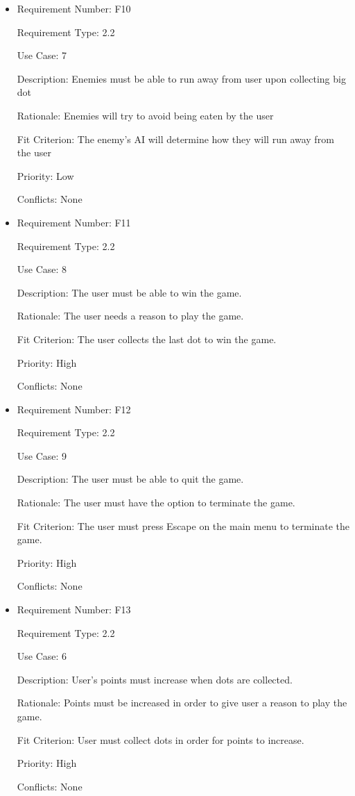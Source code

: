 \documentclass[12pt, titlepage]{article}
\begin{document}
\begin{itemize}
\item
Requirement Number: F10

Requirement Type: 2.2

Use Case: 7

Description: Enemies must be able to run away from user upon collecting big dot

Rationale: Enemies will try to avoid being eaten by the user

Fit Criterion: The enemy's AI will determine how they will run away from the user

Priority: Low

Conflicts: None
\end{itemize}

\begin{itemize}
\item
Requirement Number: F11

Requirement Type: 2.2

Use Case: 8

Description: The user must be able to win the game.

Rationale: The user needs a reason to play the game.

Fit Criterion: The user collects the last dot to win the game.

Priority: High

Conflicts: None
\end{itemize}

\begin{itemize}
\item
Requirement Number: F12

Requirement Type: 2.2

Use Case: 9

Description: The user must be able to quit the game.

Rationale: The user must have the option to terminate the game.

Fit Criterion: The user must press Escape on the main menu to terminate the game.

Priority: High

Conflicts: None
\end{itemize}

\begin{itemize}
\item
Requirement Number: F13

Requirement Type: 2.2

Use Case: 6

Description: User's points must increase when dots are collected.

Rationale: Points must be increased in order to give user a reason to play the game.

Fit Criterion: User must collect dots in order for points to increase.

Priority: High

Conflicts: None
\end{itemize}
\end{document}
